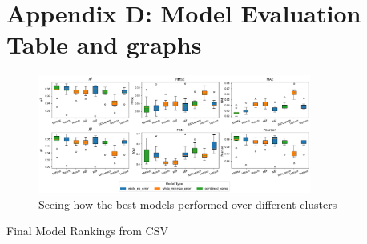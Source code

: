 \documentclass[11pt]{article}
\begin{document}
\section{Appendix D: Model Evaluation Table and graphs}
\label{appendix:D}

\begin{figure}[H]
    \centering
    \includegraphics[width=0.8\textwidth]{LatexPlots/CV_plots/boxplots.png}
    \caption{Seeing how the best models performed over different clusters}
    \label{fig:boxplots}
\end{figure}

\begin{table}[H]
    \centering
    \caption{Final Model Rankings from CSV}
    {\fontsize{7}{9.5}\selectfont
    }
    \label{tab:rankingtable}
\end{table}
    



% 
% 
 
\end{document}
